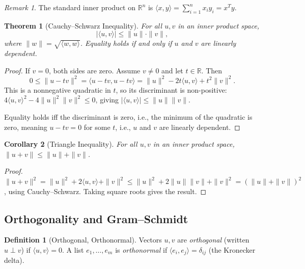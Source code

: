\documentclass[11pt,a4paper]{article}
\theoremstyle{definition}
\newtheorem{definition}{Definition}[section]
\theoremstyle{plain}
\newtheorem{theorem}{Theorem}[section]
\newtheorem{corollary}[theorem]{Corollary}
\theoremstyle{remark}
\newtheorem{remark}{Remark}[section]
\newcommand{\R}{\mathbb{R}}
\begin{document}
\begin{remark}
The standard inner product on $\R^n$ is $\langle x, y \rangle = \sum_{i=1}^n x_i y_i = x^T y$.
\end{remark}

\begin{theorem}[Cauchy--Schwarz Inequality]
\label{thm:cauchy_schwarz}
For all $u, v$ in an inner product space,
\[
    |\langle u, v \rangle| \leq \|u\| \cdot \|v\|,
\]
where $\|w\| = \sqrt{\langle w, w \rangle}$. Equality holds if and only if $u$ and $v$
are linearly dependent.
\end{theorem}

\begin{proof}
If $v = 0$, both sides are zero. Assume $v \neq 0$ and let $t \in \R$. Then
\[
    0 \leq \|u - tv\|^2 = \langle u - tv, u - tv \rangle = \|u\|^2 - 2t\langle u, v\rangle + t^2\|v\|^2.
\]
This is a nonnegative quadratic in $t$, so its discriminant is non-positive:
$4\langle u, v \rangle^2 - 4\|u\|^2\|v\|^2 \leq 0$, giving
$|\langle u, v \rangle| \leq \|u\| \|v\|$.

Equality holds iff the discriminant is zero, i.e., the minimum of the quadratic is zero,
meaning $u - tv = 0$ for some $t$, i.e., $u$ and $v$ are linearly dependent.
\end{proof}

\begin{corollary}[Triangle Inequality]
\label{cor:triangle}
For all $u, v$ in an inner product space, $\|u + v\| \leq \|u\| + \|v\|$.
\end{corollary}

\begin{proof}
$\|u + v\|^2 = \|u\|^2 + 2\langle u, v \rangle + \|v\|^2 \leq \|u\|^2 + 2\|u\|\|v\|
+ \|v\|^2 = (\|u\| + \|v\|)^2$, using Cauchy--Schwarz. Taking square roots gives the result.
\end{proof}

\subsection{Orthogonality and Gram--Schmidt}
\label{subsec:gram_schmidt}

\begin{definition}[Orthogonal, Orthonormal]
\label{def:orthogonal}
Vectors $u, v$ are \emph{orthogonal} (written $u \perp v$) if $\langle u, v \rangle = 0$.
A list $e_1, \ldots, e_m$ is \emph{orthonormal} if $\langle e_i, e_j \rangle = \delta_{ij}$
(the Kronecker delta).
\end{definition}
\end{document}
